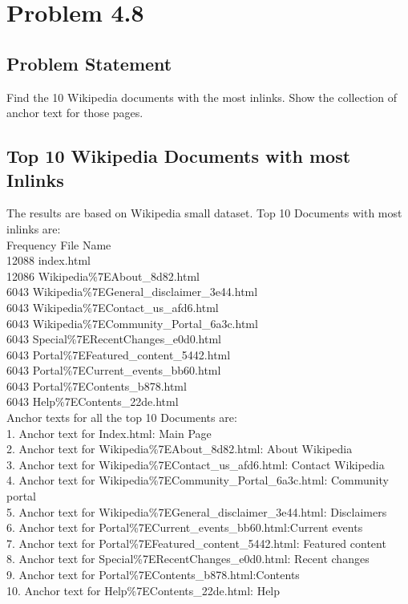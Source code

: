 \documentclass[12pt]{report}
\begin{document}
\chapter{Problem 4.8}
\section{Problem Statement}
Find the 10 Wikipedia documents with the most inlinks. Show the collection of anchor text for those pages.
\section{Top 10 Wikipedia Documents with most Inlinks}
The results are based on Wikipedia small dataset.
 Top 10 Documents with most inlinks are:\\
Frequency File Name\\
  12088 index.html\\
  12086 Wikipedia\%7EAbout\_8d82.html\\
   6043 Wikipedia\%7EGeneral\_disclaimer\_3e44.html\\
   6043 Wikipedia\%7EContact\_us\_afd6.html\\
   6043 Wikipedia\%7ECommunity\_Portal\_6a3c.html\\
   6043 Special\%7ERecentChanges\_e0d0.html\\
   6043 Portal\%7EFeatured\_content\_5442.html\\
   6043 Portal\%7ECurrent\_events\_bb60.html\\
   6043 Portal\%7EContents\_b878.html\\
   6043 Help\%7EContents\_22de.html\\

Anchor texts for all the top 10 Documents are:\\

1. Anchor text for Index.html: Main Page\\
2. Anchor text for Wikipedia\%7EAbout\_8d82.html: About Wikipedia\\ 
3. Anchor text for Wikipedia\%7EContact\_us\_afd6.html: Contact Wikipedia\\
4. Anchor text for Wikipedia\%7ECommunity\_Portal\_6a3c.html: Community portal\\
5. Anchor text for Wikipedia\%7EGeneral\_disclaimer\_3e44.html: Disclaimers\\
6. Anchor text for Portal\%7ECurrent\_events\_bb60.html:Current events\\
7. Anchor text for Portal\%7EFeatured\_content\_5442.html: Featured content\\
8. Anchor text for Special\%7ERecentChanges\_e0d0.html: Recent changes\\
9. Anchor text for Portal\%7EContents\_b878.html:Contents\\
10. Anchor text for Help\%7EContents\_22de.html: Help\\
\end{document}
